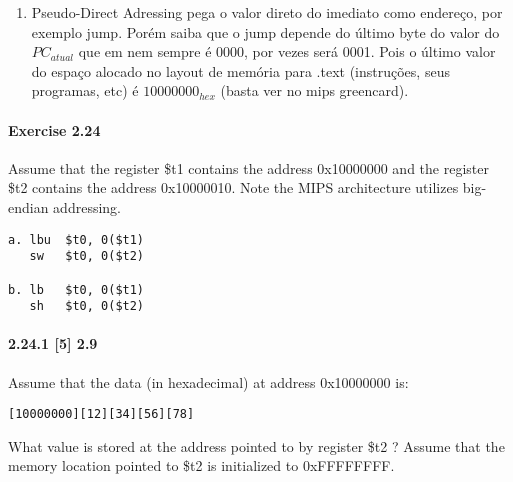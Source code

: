 \documentclass{article}
\begin{document}
\begin{enumerate}
\item Pseudo-Direct Adressing pega o valor direto do imediato como endereço, por
exemplo jump. Porém saiba que o jump depende do último byte do valor do
$PC_{atual}$ que em nem sempre é 0000, por vezes será 0001. Pois o último valor
do espaço alocado no layout de memória para .text (instruções, seus programas,
etc) é $10000000_{hex}$ (basta ver no mips greencard).
\end{enumerate}

\paragraph{Exercise 2.24}

Assume that the register \$t1 contains the address 0x10000000 and the register
\$t2 contains the address 0x10000010. Note the MIPS architecture utilizes big-
endian addressing.

\begin{verbatim}
a. lbu  $t0, 0($t1)
   sw   $t0, 0($t2)

b. lb   $t0, 0($t1)
   sh   $t0, 0($t2)
\end{verbatim}

\paragraph{2.24.1 [5] 2.9} Assume that the data (in hexadecimal) at address
0x10000000 is:

\begin{verbatim}
[10000000][12][34][56][78]
\end{verbatim}

What value is stored at the address pointed to by register \$t2 ? Assume that
the memory location pointed to \$t2 is initialized to 0xFFFFFFFF.
\end{document}
